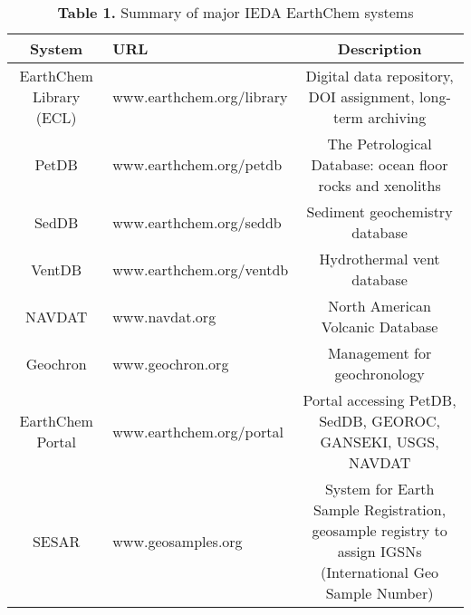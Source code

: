 \begin{table}[p]											
\caption{\textbf{Table 1.} Summary of major IEDA EarthChem systems}
\begin{tabular}{|c|l|c|}											
\hline											
System	&	URL	&	Description	 \\	
\hline											
\hline	
EarthChem Library (ECL)	&	www.earthchem.org/library	&	Digital data repository, DOI assignment, long-term archiving			\\
PetDB	&	www.earthchem.org/petdb	&	The Petrological Database: ocean floor rocks and xenoliths			\\
SedDB	&	www.earthchem.org/seddb	&	Sediment geochemistry database				\\
VentDB	&	www.earthchem.org/ventdb	&	Hydrothermal vent database			\\
NAVDAT	&	www.navdat.org 	&	North American Volcanic Database				\\
Geochron	&	www.geochron.org	&	Management for geochronology				\\
EarthChem Portal	&	www.earthchem.org/portal	&	Portal accessing PetDB, SedDB, GEOROC, GANSEKI, USGS, NAVDAT			\\
SESAR	&	www.geosamples.org	&	System for Earth Sample Registration, geosample registry to assign IGSNs (International Geo Sample Number)		\\
\hline											
\end{tabular}											
										
\end{table}